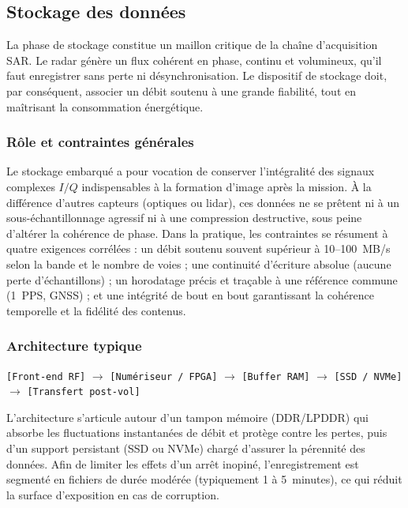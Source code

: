 \subsection{Stockage des données}

La phase de stockage constitue un maillon critique de la chaîne d’acquisition SAR. Le radar génère un flux cohérent en phase, continu et volumineux, qu’il faut enregistrer sans perte ni désynchronisation. Le dispositif de stockage doit, par conséquent, associer un débit soutenu à une grande fiabilité, tout en maîtrisant la consommation énergétique.

\subsubsection{Rôle et contraintes générales}

Le stockage embarqué a pour vocation de conserver l’intégralité des signaux complexes $I/Q$ indispensables à la formation d’image après la mission. À la différence d’autres capteurs (optiques ou lidar), ces données ne se prêtent ni à un sous-échantillonnage agressif ni à une compression destructive, sous peine d’altérer la cohérence de phase. Dans la pratique, les contraintes se résument à quatre exigences corrélées : un débit soutenu souvent supérieur à 10–100~MB/s selon la bande et le nombre de voies ; une continuité d’écriture absolue (aucune perte d’échantillons) ; un horodatage précis et traçable à une référence commune (1~PPS, GNSS) ; et une intégrité de bout en bout garantissant la cohérence temporelle et la fidélité des contenus.

\subsubsection{Architecture typique}

\begin{center}
\texttt{[Front-end RF]} $\rightarrow$ \texttt{[Numériseur / FPGA]} $\rightarrow$ \texttt{[Buffer RAM]} $\rightarrow$ \texttt{[SSD / NVMe]} $\rightarrow$ \texttt{[Transfert post-vol]}
\end{center}

L’architecture s’articule autour d’un tampon mémoire (DDR/LPDDR) qui absorbe les fluctuations instantanées de débit et protège contre les pertes, puis d’un support persistant (SSD ou NVMe) chargé d’assurer la pérennité des données. Afin de limiter les effets d’un arrêt inopiné, l’enregistrement est segmenté en fichiers de durée modérée (typiquement 1 à 5~minutes), ce qui réduit la surface d’exposition en cas de corruption.

